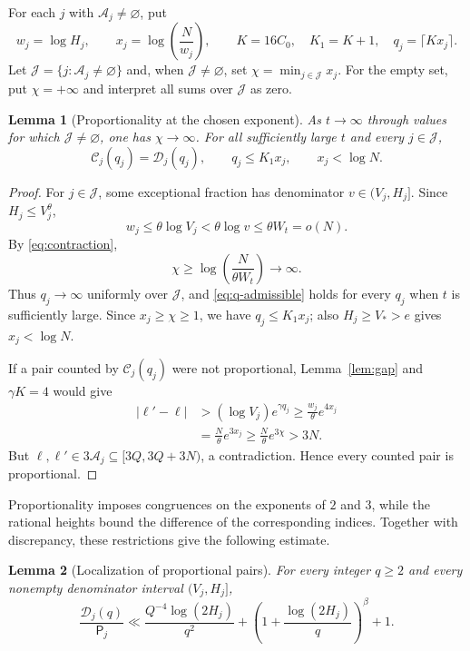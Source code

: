 \documentclass[11pt,reqno]{amsart}
\theoremstyle{definition}
\theoremstyle{plain}
\newtheorem{lemma}{Lemma}[section]
\theoremstyle{definition}
\theoremstyle{remark}
\newcommand{\Bad}{\mathcal A}
\begin{document}
For each $j$ with $\Bad_j\ne\varnothing$, put
\[
 w_j=\log H_j,\qquad x_j=\log\left(\frac{N}{w_j}\right),
 \qquad K=16C_0,\quad K_1=K+1,\quad
 q_j=\lceil Kx_j\rceil.
\]
Let $\mathcal J=\{j:\Bad_j\ne\varnothing\}$ and, when
$\mathcal J\ne\varnothing$, set
$\chi=\min_{j\in\mathcal J}x_j$.
For the empty set, put $\chi=+\infty$ and interpret
all sums over $\mathcal J$ as zero.

\begin{lemma}[Proportionality at the chosen exponent]
\label{lem:proportionality}
As $t\to\infty$ through values for which
$\mathcal J\ne\varnothing$, one has $\chi\to\infty$.
For all sufficiently large $t$ and every
$j\in\mathcal J$,
\[
 \mathcal C_j(q_j)=\mathcal D_j(q_j),\qquad
 q_j\le K_1x_j,\qquad x_j<\log N.
\]
\end{lemma}

\begin{proof}
For $j\in\mathcal J$, some exceptional fraction
has denominator $v\in(V_j,H_j]$. Since
$H_j\le V_j^\theta$,
\[
 w_j\le\theta\log V_j
 <\theta\log v\le\theta W_t=o(N).
\]
By \eqref{eq:contraction},
\[
 \chi\ge\log\left(\frac{N}{\theta W_t}\right)
 \longrightarrow\infty.
\]
Thus $q_j\to\infty$ uniformly over $\mathcal J$,
and \eqref{eq:q-admissible} holds for every $q_j$
when $t$ is sufficiently large. Since
$x_j\ge\chi\ge1$, we have $q_j\le K_1x_j$;
also $H_j\ge V_*>e$ gives $x_j<\log N$.

If a pair counted by $\mathcal C_j(q_j)$ were
not proportional, Lemma~\ref{lem:gap} and
$\gamma K=4$ would give
\[
 \begin{aligned}
 |\ell'-\ell|
 &>(\log V_j)e^{\gamma q_j}
 \ge\frac{w_j}{\theta}e^{4x_j}\\
 &=\frac{N}{\theta}e^{3x_j}
 \ge\frac{N}{\theta}e^{3\chi}>3N.
 \end{aligned}
\]
But $\ell,\ell'\in3\Bad_j\subseteq[3Q,3Q+3N)$,
a contradiction. Hence every counted pair
is proportional.
\end{proof}

Proportionality imposes congruences on the exponents
of $2$ and $3$, while the rational heights bound the
difference of the corresponding indices. Together
with discrepancy, these restrictions give the following
estimate.

\begin{lemma}[Localization of proportional pairs]
\label{lem:index-bound}
For every integer $q\ge2$ and every nonempty
denominator interval $(V_j,H_j]$,
\begin{equation}\label{eq:rloc}
 \frac{\mathcal D_j(q)}{\mathsf P_j}
 \ll\frac{Q^{-4}\log(2H_j)}{q^2}
 +\left(1+\frac{\log(2H_j)}q\right)^\beta+1.
\end{equation}
\end{lemma}
\end{document}
